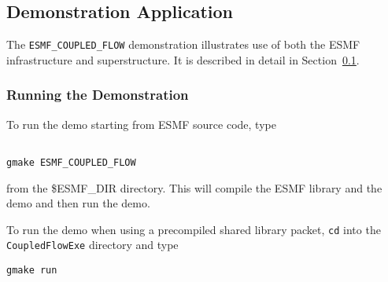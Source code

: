 \subsection{Demonstration Application}
\label{sec:demo}

The {\tt ESMF\_COUPLED\_FLOW} demonstration illustrates use of both the
ESMF infrastructure and superstructure.  It is described in detail in 
Section~\ref{sec:demo}.

\subsubsection{Running the Demonstration}

To run the demo starting from ESMF source code, type 
\begin{verbatim}

gmake ESMF_COUPLED_FLOW

\end{verbatim}
from the \$ESMF\_DIR directory.  This will compile the 
ESMF library and the demo and then run the demo.

To run the demo when using a precompiled shared
library packet, {\tt cd} into the {\tt CoupledFlowExe}
directory and type

\begin{verbatim}
gmake run
\end{verbatim}






























